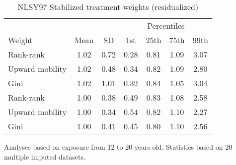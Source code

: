 \begin{table}[htp]
\centering
\footnotesize
\setlength{\tabcolsep}{10pt}
\renewcommand{\arraystretch}{1}
\begin{threeparttable}
\centering
\caption{NLSY97 Stabilized treatment weights (residualized)} 
\label{tab:nlsy97_ipt_weigths}
\begin{tabular}{lcccccc}
  \hline
\multicolumn{3}{c}{} & \multicolumn{4}{c}{Percentiles} \\ 
 \cmidrule{4-7} 
Weight & Mean & SD & 1st & 25th & 75th & 99th \\ 
  \hline
\quad Rank-rank & 1.02 & 0.72 & 0.28 & 0.81 & 1.09 & 3.07 \\ 
  \quad Upward mobility & 1.02 & 0.48 & 0.34 & 0.82 & 1.09 & 2.80 \\ 
  \quad Gini & 1.02 & 1.01 & 0.32 & 0.84 & 1.05 & 3.04 \\ 
  \quad Rank-rank & 1.00 & 0.38 & 0.49 & 0.83 & 1.08 & 2.58 \\ 
  \quad Upward mobility & 1.00 & 0.34 & 0.54 & 0.82 & 1.10 & 2.27 \\ 
  \quad Gini & 1.00 & 0.41 & 0.45 & 0.80 & 1.10 & 2.56 \\ 
   \hline
\end{tabular}
\begin{tablenotes}
\footnotesize
\item Analyses based on exposure from 12 to 20 years old. Statistics based on  20 multiple imputed datasets.
\end{tablenotes}
\end{threeparttable}
\end{table}
